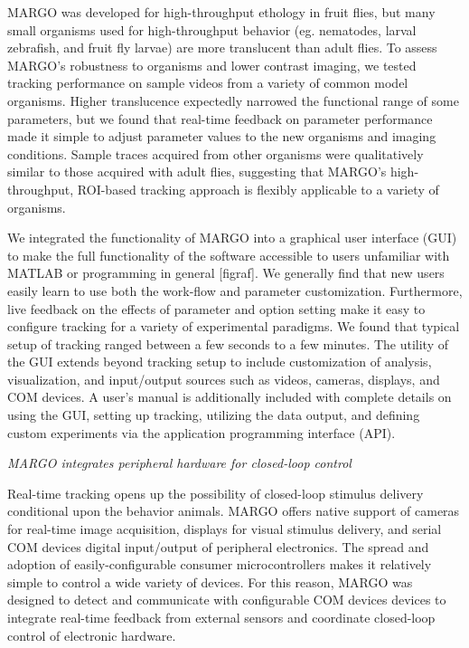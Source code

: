 \documentclass[10pt]{article}
\begin{document}
\begin{multicols}{2}
MARGO was developed for high-throughput ethology in fruit flies, but many small organisms used for high-throughput behavior (eg. nematodes, larval zebrafish, and fruit fly larvae) are more translucent than adult flies. To assess MARGO’s robustness to organisms and lower contrast imaging, we tested tracking performance on sample videos from a variety of common model organisms. Higher translucence expectedly narrowed the functional range of some parameters, but we found that real-time feedback on parameter performance made it simple to adjust parameter values to the new organisms and imaging conditions. Sample traces acquired from other organisms were qualitatively similar to those acquired with adult flies, suggesting that MARGO’s high-throughput, ROI-based tracking approach is flexibly applicable to a variety of organisms. 

We integrated the functionality of MARGO into a graphical user interface (GUI) to make the full functionality of the software accessible to users unfamiliar with MATLAB or programming in general [figraf]. We generally find that new users easily learn to use both the work-flow and parameter customization. Furthermore, live feedback on the effects of parameter and option setting make it easy to configure tracking for a variety of experimental paradigms. We found that typical setup of tracking ranged between a few seconds to a few minutes. The utility of the GUI extends beyond tracking setup to include customization of analysis, visualization, and input/output sources such as videos, cameras, displays, and COM devices. A user's manual is additionally included with complete details on using the GUI, setting up tracking, utilizing the data output, and defining custom experiments via the application programming interface (API).


\textit{MARGO integrates peripheral hardware for closed-loop control}

Real-time tracking opens up the possibility of closed-loop stimulus delivery conditional upon the behavior animals. MARGO offers native support of cameras for real-time image acquisition, displays for visual stimulus delivery, and serial COM devices digital input/output of peripheral electronics. The spread and adoption of easily-configurable consumer microcontrollers makes it relatively simple to control a wide variety of devices. For this reason, MARGO was designed to detect and communicate with configurable COM devices devices to integrate real-time feedback from external sensors and coordinate closed-loop control of electronic hardware.


\end{multicols}
\end{document}
